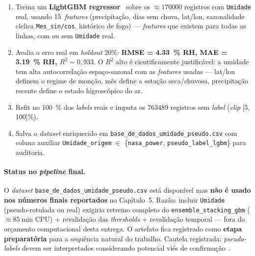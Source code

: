 \begin{enumerate}
  \item Treina um \textbf{LightGBM regressor}~\cite{ke2017lightgbm} sobre os \(\approx \num{170000}\) registros com \texttt{Umidade} real, usando 15~\emph{features} (precipitação, dias sem chuva, lat/lon, sazonalidade cíclica \texttt{Mes\_sin/cos}, histórico de fogo) --- \emph{features} que existem para todas as linhas, com ou sem \texttt{Umidade} real.

  \item Avalia o erro real em \emph{holdout} 20\%: \textbf{RMSE = \SI{4,33}{\percent} RH, MAE = \SI{3,19}{\percent} RH, \(R^2 = 0{,}933\)}. O \(R^2\) alto é cientificamente justificável: a umidade tem alta autocorrelação espaço-sazonal com as \emph{features} usadas --- lat/lon definem o regime de monção, mês define a estação seca/chuvosa, precipitação recente define o estado higroscópico do ar.

  \item Refit no \SI{100}{\percent} dos \emph{labels} reais e imputa os \num{763489} registros sem \emph{label} (\emph{clip} [5, 100]\%).

  \item Salva o \emph{dataset} enriquecido em \texttt{base\_de\_dados\_umidade\_pseudo.csv} com coluna auxiliar \texttt{Umidade\_origem} \(\in\) \{\texttt{nasa\_power}, \texttt{pseudo\_label\_lgbm}\} para auditoria.
\end{enumerate}

\paragraph{Status no \emph{pipeline} final.} O \emph{dataset} \texttt{base\_de\_dados\_umidade\_pseudo.csv} está disponível mas \textbf{não é usado nos números finais reportados} no Capítulo~5. Razão: incluir \texttt{Umidade} (pseudo-rotulada ou real) exigiria retreino completo do \texttt{ensemble\_stacking\_gbm} (\(\approx \SI{85}{\minute}\) CPU) + revalidação das \emph{thresholds} + revalidação temporal --- fora do orçamento computacional desta entrega. O artefato fica registrado como \textbf{etapa preparatória} para a sequência natural do trabalho. Cautela registrada: \emph{pseudo-labels} devem ser interpretados considerando potencial viés de confirmação~\cite{arazo2020pseudo}.
